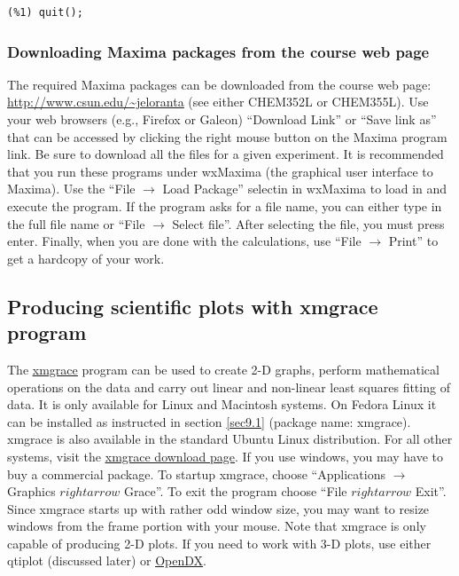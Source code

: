 \documentclass[byrevtex,amssymb,aps,pra,floatfix,letterpaper]{revtex4}
\begin{document}
\begin{verbatim}
(%1) quit();
\end{verbatim}

\subsubsection{Downloading Maxima packages from the course web page}

The required Maxima packages can be downloaded from the course web page: \href{http://www.csun.edu/\~jeloranta}{\underline{\url{http://www.csun.edu/~jeloranta}}} (see either CHEM352L or CHEM355L). Use your web browsers (e.g., Firefox or Galeon) ``Download Link'' or ``Save link as'' that can be accessed by clicking the right mouse button on the Maxima program link. Be sure to download all the files for a given experiment. It is recommended that you run these programs under wxMaxima (the graphical user interface to Maxima). Use the ``File $\rightarrow$ Load Package'' selectin in wxMaxima to load in and execute the program. If the program asks for a file name, you can either type in the full file name or
``File $\rightarrow$ Select file''. After selecting the file, you must press enter. Finally, when you are done with the calculations, use ``File $\rightarrow$ Print'' to get a hardcopy of your work.

\subsection{Producing scientific plots with xmgrace program}

The \href{http://plasma-gate.weizmann.ac.il/Grace/}{\underline{xmgrace}} program can be used to create 2-D graphs, perform mathematical operations on the data and carry out linear and non-linear least squares fitting of data. It is only available for Linux and Macintosh systems. On Fedora Linux it can be installed as instructed in section \ref{sec9.1} (package name: xmgrace). xmgrace is also available in the standard Ubuntu Linux distribution. For all other systems, visit the \href{ftp://plasma-gate.weizmann.ac.il/pub/grace/}{\underline{xmgrace download page}}. If you use windows, you may have to buy a commercial package. To startup xmgrace, choose ``Applications $\rightarrow$ Graphics $rightarrow$ Grace''. To exit the program choose ``File $rightarrow$ Exit''. Since xmgrace starts up with rather odd window size, you may want to resize windows from the frame portion with your mouse. Note that xmgrace is only capable of producing 2-D plots. If you need to work with 3-D plots, use either qtiplot (discussed later) or \href{http://www.opendx.org/}{\underline{OpenDX}}.\\
\end{document}
